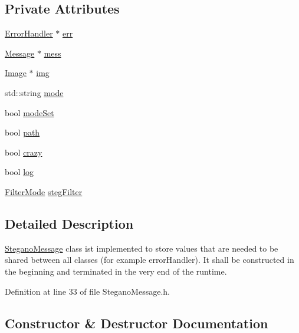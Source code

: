 \subsection*{Private Attributes}
\begin{DoxyCompactItemize}
\item 
\mbox{\hyperlink{classErrorHandler}{Error\+Handler}} $\ast$ \mbox{\hyperlink{classSteganoMessage_a26b631e00716be7a89cbcf22cf0b7291}{err}}
\item 
\mbox{\hyperlink{classMessage}{Message}} $\ast$ \mbox{\hyperlink{classSteganoMessage_a64f70bbacb0662cebe764316658da35d}{mess}}
\item 
\mbox{\hyperlink{classImage}{Image}} $\ast$ \mbox{\hyperlink{classSteganoMessage_acd7dba217d5df515d93ddf814734ecf4}{img}}
\item 
std\+::string \mbox{\hyperlink{classSteganoMessage_a8772194b7823da730648f8d4c06334a8}{mode}}
\item 
bool \mbox{\hyperlink{classSteganoMessage_ae1da17c621a8db71fa4eb3b148a82ceb}{mode\+Set}}
\item 
bool \mbox{\hyperlink{classSteganoMessage_a399f4c181d3b7b15ccdb5c925a7a1f51}{path}}
\item 
bool \mbox{\hyperlink{classSteganoMessage_aa66c9e1d0367981d42ede819e1a51131}{crazy}}
\item 
bool \mbox{\hyperlink{classSteganoMessage_a687c455d3f09eb5349e0358cb07aa21c}{log}}
\item 
\mbox{\hyperlink{constants_8h_a36bd51b89b9e0e6e4dbbe565b9155083}{Filter\+Mode}} \mbox{\hyperlink{classSteganoMessage_af20fb772ae34deaccd23144b38f06320}{steg\+Filter}}
\end{DoxyCompactItemize}


\subsection{Detailed Description}
\mbox{\hyperlink{classSteganoMessage}{Stegano\+Message}} class ist implemented to store values that are needed to be shared between all classes (for example error\+Handler). It shall be constructed in the beginning and terminated in the very end of the runtime. 

Definition at line 33 of file Stegano\+Message.\+h.



\subsection{Constructor \& Destructor Documentation}
\mbox{\label{classSteganoMessage_a7a14cbd03ebca6764f8b234f8dcd1697}} 

